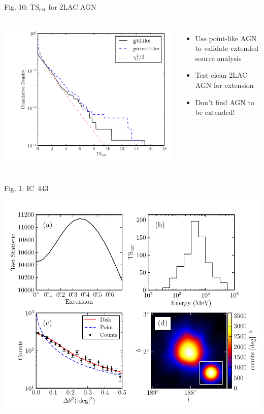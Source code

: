 \documentclass[12pt]{beamer}
\begin{document}
\begin{frame}{Fig. 10: $\text{TS}_\text{ext}$ for 2LAC AGN}
  \begin{columns}
    \includegraphics[scale=0.45]{plots/agn_color.pdf}
    \begin{itemize}
      \item Use point-like AGN to validate extended source analysis
      \item Test clean 2LAC AGN for extension
      \item Don't find AGN to be extended!
    \end{itemize}
  \end{columns}
\end{frame}

\begin{frame}{Fig. 1: IC~443}
    \includegraphics[scale=0.5]{plots/four_plots_ic443_color.pdf}
\end{frame}
\end{document}
